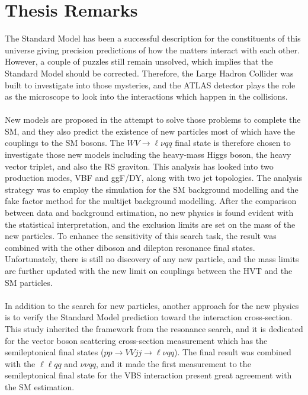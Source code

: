 \chapter{Thesis Remarks}
The Standard Model has been a successful description for the constituents of this universe giving precision predictions of how the matters interact with each other. However, a couple of puzzles still remain unsolved, which implies that the Standard Model should be corrected. Therefore, the Large Hadron Collider was built to investigate into those mysteries, and the ATLAS detector plays the role as the microscope to look into the interactions which happen in the collisions.
\\
\\New models are proposed in the attempt to solve those problems to complete the SM, and they also predict the existence of new particles most of which have the couplings to the SM bosons. The $WV\to \ell\nu qq$ final state is therefore chosen to investigate those new models including the heavy-mass Higgs boson, the heavy vector triplet, and also the RS graviton. This analysis has looked into two production modes, VBF and ggF/DY, along with two jet topologies. The analysis strategy was to employ the simulation for the SM background modelling and the fake factor method for the multijet background modelling. After the comparison between data and background estimation, no new physics is found evident with the statistical interpretation, and the exclusion limits are set on the mass of the new particles. To enhance the sensitivity of this search task, the result was combined with the other diboson and dilepton resonance final states. Unfortunately, there is still no discovery of any new particle, and the mass limits are further updated with the new limit on couplings between the HVT and the SM particles. 
\\
\\In addition to the search for new particles, another approach for the new physics is to verify the Standard Model prediction toward the interaction cross-section. This study inherited the framework from the resonance search, and it is dedicated for the vector boson scattering cross-section measurement which has the semileptonical final states ($pp\to VVjj \to \ell\nu qq$). The final result was combined with the $\ell\ell qq$ and $\nu\nu qq$, and it made the first measurement to the semileptonical final state for the VBS interaction present great agreement with the SM estimation.
\\
